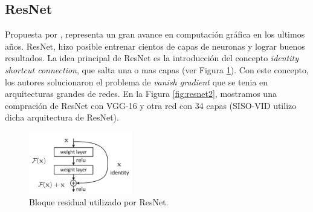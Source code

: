 \documentclass{article}
\begin{document}
	\subsection{ResNet}

	Propuesta por \cite{he2016deep}, representa un gran avance en computación gráfica en los ultimos años. ResNet, hizo posible entrenar cientos de capas de neuronas y lograr buenos resultados. La idea principal de ResNet es la introducción del concepto \textit{identity shortcut connection}, que salta una o mas capas (ver Figura \ref{fig:resnet1}). Con este concepto, los autores solucionaron el problema de \textit{vanish gradient} que se tenia en arquitecturas grandes de redes. En la Figura \ref{fig:resnet2}, mostramos una compración de ResNet con VGG-16 y otra red con 34 capas (SISO-VID utilizo dicha arquitectura de ResNet).

	\begin{figure}[H]
		\centering
		\includegraphics[width=0.4\textwidth]{img/resnet1}		
		\caption{Bloque residual utilizado por ResNet.}
		\label{fig:resnet1}
	\end{figure} 
\end{document}
